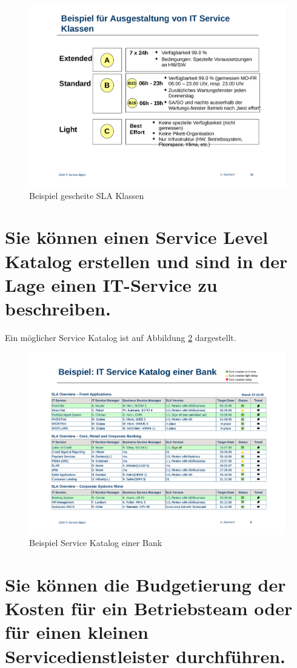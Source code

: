 \begin{figure}[h!]
\centering
\includegraphics[width=0.7\linewidth]{fig/beispiel-schlaue-sla-klassen}
\caption{Beispiel gescheite SLA Klassen}
\label{fig:beispiel-schlaue-sla-klassen}
\end{figure}

\newpage

\section{Sie können einen Service Level Katalog erstellen und sind in der Lage einen IT-Service zu beschreiben.}

Ein möglicher Service Katalog ist auf Abbildung \ref{fig:beispiel-service-katalog} dargestellt.

\begin{figure}[h!]
\centering
\includegraphics[width=0.7\linewidth]{fig/beispiel-service-katalog}
\caption{Beispiel Service Katalog einer Bank}
\label{fig:beispiel-service-katalog}
\end{figure}

\section{Sie können die Budgetierung der Kosten für ein Betriebsteam oder für einen kleinen Servicedienstleister durchführen.}

